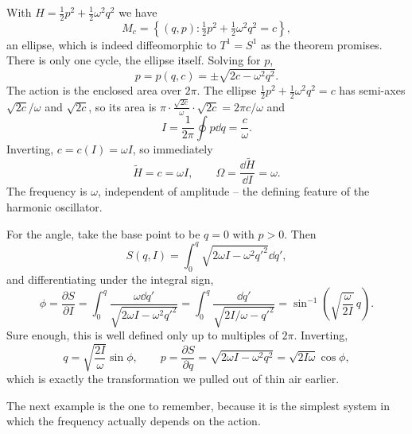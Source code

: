 \documentclass[a4paper]{scrartcl}
\begin{document}
\begin{example}
	With $H = \frac{1}{2}p^2 + \frac{1}{2}\omega^2q^2$ we have
	$$
	M_c = \left\{(q,p) : \tfrac{1}{2}p^2 + \tfrac{1}{2}\omega^2q^2 = c\right\},
	$$
	an ellipse, which is indeed diffeomorphic to $T^1 = S^1$ as the theorem promises. There is only one cycle, the ellipse itself. Solving for $p$,
	$$
	p = p(q,c) = \pm\sqrt{2c - \omega^2q^2}.
	$$
	The action is the enclosed area over $2\pi$. The ellipse $\frac{1}{2}p^2 + \frac{1}{2}\omega^2 q^2 = c$ has semi-axes $\sqrt{2c}/\omega$ and $\sqrt{2c}$, so its area is $\pi\cdot\frac{\sqrt{2c}}{\omega}\cdot\sqrt{2c} = 2\pi c/\omega$ and
	$$
	I = \frac{1}{2\pi}\oint p\dd q = \frac{c}{\omega}.
	$$
	Inverting, $c = c(I) = \omega I$, so immediately
	$$
	\tilde H = c = \omega I, \qquad \Omega = \frac{\dd\tilde H}{\dd I} = \omega.
	$$
	The frequency is $\omega$, independent of amplitude -- the defining feature of the harmonic oscillator.

	For the angle, take the base point to be $q = 0$ with $p > 0$. Then
	$$
	S(q, I) = \int_0^q\sqrt{2\omega I - \omega^2 q'^2}\dd q',
	$$
	and differentiating under the integral sign,
	$$
	\phi = \frac{\partial S}{\partial I} = \int_0^q\frac{\omega \dd q'}{\sqrt{2\omega I - \omega^2 q'^2}} = \int_0^q \frac{\dd q'}{\sqrt{2I/\omega - q'^2}} = \sin^{-1}\left(\sqrt{\frac{\omega}{2I}}\,q\right).
	$$
	Sure enough, this is well defined only up to multiples of $2\pi$. Inverting,
	$$
	q = \sqrt{\frac{2I}{\omega}}\sin\phi, \qquad p = \frac{\partial S}{\partial q} = \sqrt{2\omega I - \omega^2q^2} = \sqrt{2I\omega}\cos\phi,
	$$
	which is exactly the transformation we pulled out of thin air earlier.
\end{example}

The next example is the one to remember, because it is the simplest system in which the frequency actually depends on the action.
\end{document}
